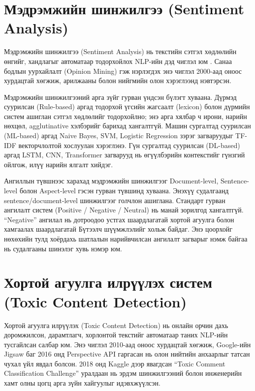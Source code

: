 \section{Мэдрэмжийн шинжилгээ (Sentiment Analysis)}

Мэдрэмжийн шинжилгээ (Sentiment Analysis) нь текстийн сэтгэл хөдлөлийн өнгийг,
хандлагыг автоматаар тодорхойлох NLP-ийн дэд чиглэл юм \cite{liu2012}. Санаа
бодлын уурхайлалт (Opinion Mining) гэж нэрлэгдэх энэ чиглэл 2000-аад оноос
хурдацтай хөгжиж, арилжааны болон нийгмийн олон хэрэглээнд нэвтэрсэн.

Мэдрэмжийн шинжилгээний арга зүйг гурван үндсэн бүлэгт хуваана. Дүрмэд
суурилсан (Rule-based) аргад тодорхой үгсийн жагсаалт (lexicon) болон дүрмийн
систем ашиглан сэтгэл хөдлөлийг тодорхойлно; энэ арга хялбар ч ирони, нарийн
нөхцөл, agglutinative хэлбэрийг барихад хангалтгүй. Машин сургалтад суурилсан
(ML-based) аргад Naive Bayes, SVM, Logistic Regression зэрэг загваруудыг
TF-IDF векторчлолтой хослуулан хэрэглэнэ. Гүн сургалтад суурилсан (DL-based)
аргад LSTM, CNN, Transformer загварууд нь өгүүлбэрийн контекстийг гүнзгий
ойлгож, илүү нарийн ялгалт хийдэг.

Ангиллын түвшнээс харахад мэдрэмжийн шинжилгээг Document-level, Sentence-level
болон Aspect-level гэсэн гурван түвшинд хуваана. Энэхүү судалгаанд
sentence/document-level шинжилгээг голчлон ашиглана. Стандарт гурван ангилалт
систем (Positive / Negative / Neutral) нь манай зорилгод хангалтгүй.
``Negative'' ангилал нь дотроодоо устгах шаардлагатай хортой агуулга болон
хамгаалах шаардлагатай Бүтээлч шүүмжлэлийг хольж байдаг. Энэ цоорхойг
нөхөхийн тулд хоёрдахь шатлалын нарийвчилсан ангилалт загварыг нэмж байгаа нь
судалгааны шинэлэг хувь нэмэр юм.

\section{Хортой агуулга илрүүлэх систем (Toxic Content Detection)}

Хортой агуулга илрүүлэх (Toxic Content Detection) нь онлайн орчин дахь
доромжилсон, дарамтлагч, хорлонтой текстийг автоматаар таних NLP-ийн
тусгайлсан салбар юм. Энэ чиглэл 2010-аад оноос хурдацтай хөгжиж, Google-ийн
Jigsaw баг 2016 онд Perspective API гаргасан нь олон нийтийн анхаарлыг татсан
чухал үйл явдал болсон. 2018 онд Kaggle дээр явагдсан ``Toxic Comment
Classification Challenge'' уралдаан нь эрдэм шинжилгээний болон инженерийн
хамт олны цогц арга зүйн хайгуулыг идэвхжүүлсэн.

